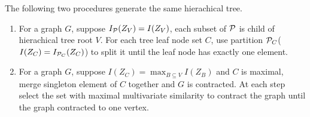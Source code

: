 \begin{proposition}\label{prop:ta}
The following two procedures generate the same hierachical tree.
\begin{enumerate}
\item For a graph $G$, suppose $I_{\P}(Z_V)=I(Z_V)$, each subset of $\P$ is child of hierachical tree root $V$. For each tree leaf node set $C$, use partition $\P_C$($I(Z_C)=I_{\P_C}(Z_C)$) to split it until the leaf node has exactly one element.
\item For a graph $G$, suppose $I(Z_C) = \max_{B\subseteq V} I(Z_B)$ and $C$ is maximal, merge singleton element of $C$ together and $G$ is contracted. At each step select the set with maximal multivariate similarity to contract the graph until the graph contracted to one vertex.
\end{enumerate}
\end{proposition}